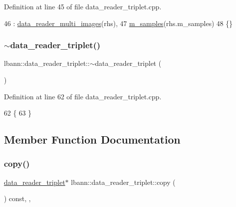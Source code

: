 Definition at line 45 of file data\+\_\+reader\+\_\+triplet.\+cpp.


\begin{DoxyCode}
46   : \hyperlink{classlbann_1_1data__reader__multi__images_a91725ae909007b26410837257aa921dc}{data\_reader\_multi\_images}(rhs),
47     \hyperlink{classlbann_1_1data__reader__triplet_a1f414c6d80f6e48fc91f98db0531f1f8}{m\_samples}(rhs.m\_samples)
48 \{\}
\end{DoxyCode}
\mbox{\label{classlbann_1_1data__reader__triplet_a55f298a4f0f1232325b0e8265e1a4e2f}} 
\subsubsection{\texorpdfstring{$\sim$data\+\_\+reader\+\_\+triplet()}{~data\_reader\_triplet()}}
{\footnotesize\ttfamily lbann\+::data\+\_\+reader\+\_\+triplet\+::$\sim$data\+\_\+reader\+\_\+triplet (\begin{DoxyParamCaption}{ }\end{DoxyParamCaption})\hspace{0.3cm}{\ttfamily [override]}}



Definition at line 62 of file data\+\_\+reader\+\_\+triplet.\+cpp.


\begin{DoxyCode}
62                                           \{
63 \}
\end{DoxyCode}


\subsection{Member Function Documentation}
\mbox{\label{classlbann_1_1data__reader__triplet_aa390c4e801dfa367895ef0904daa0b77}} 
\subsubsection{\texorpdfstring{copy()}{copy()}}
{\footnotesize\ttfamily \hyperlink{classlbann_1_1data__reader__triplet}{data\+\_\+reader\+\_\+triplet}$\ast$ lbann\+::data\+\_\+reader\+\_\+triplet\+::copy (\begin{DoxyParamCaption}{ }\end{DoxyParamCaption}) const\hspace{0.3cm}{\ttfamily [inline]}, {\ttfamily [override]}, {\ttfamily [virtual]}}



